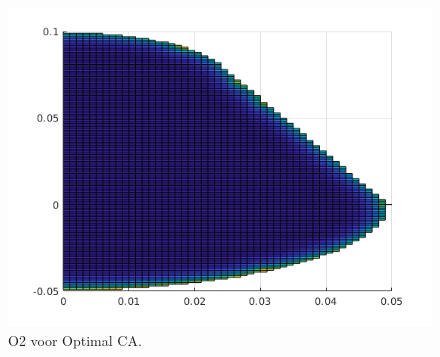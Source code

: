 \documentclass{beamer}
\begin{document}
\begin{frame}
\begin{columns}
\begin{column}{0.48\textwidth}
\begin{figure}
\includegraphics[width = 1\textwidth]{Optimal_CA_pear_O2_boven.png}
\caption{O2 voor Optimal CA.}
\end{figure}
\end{column}
\end{columns}


\end{frame}
\end{document}
